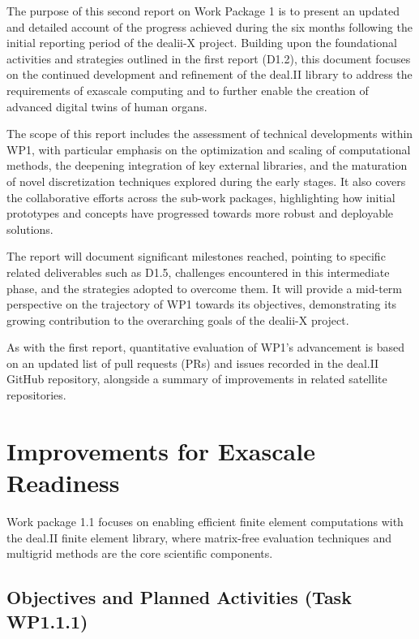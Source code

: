 \documentclass[a4paper,12pt]{article}
\begin{document}
The purpose of this second report on Work Package 1 is to present an updated and detailed account of the progress achieved during the six months following the initial reporting period of the dealii-X project. Building upon the foundational activities and strategies outlined in the first report (D1.2), this document focuses on the continued development and refinement of the deal.II library to address the requirements of exascale computing and to further enable the creation of advanced digital twins of human organs.

The scope of this report includes the assessment of technical developments within WP1, with particular emphasis on the optimization and scaling of computational methods, the deepening integration of key external libraries, and the maturation of novel discretization techniques explored during the early stages. It also covers the collaborative efforts across the sub-work packages, highlighting how initial prototypes and concepts have progressed towards more robust and deployable solutions.

The report will document significant milestones reached, pointing to specific related deliverables such as D1.5, challenges encountered in this intermediate phase, and the strategies adopted to overcome them. It will provide a mid-term perspective on the trajectory of WP1 towards its objectives, demonstrating its growing contribution to the overarching goals of the dealii-X project.

As with the first report, quantitative evaluation of WP1's advancement is based on an updated list of pull requests (PRs) and issues recorded in the deal.II GitHub repository, alongside a summary of improvements in related satellite repositories.%

\section{Improvements for Exascale Readiness}

Work package 1.1 focuses on enabling efficient finite element computations
with the deal.II finite element library, where matrix-free evaluation
techniques and multigrid methods are the core scientific components.

\subsection{Objectives and Planned Activities (Task WP1.1.1)}
\end{document}

